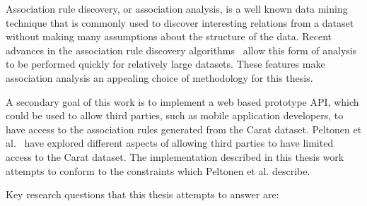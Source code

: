 Association rule discovery, or association analysis, is a well known data mining technique that is commonly used to discover interesting relations from a dataset without making many assumptions about the structure of the data. Recent advances in the association rule discovery algorithms~\cite{Han:2000:MFP:335191.335372, Li:2008:PPF:1454008.1454027} allow this form of analysis to be performed quickly for relatively large datasets. These features make association analysis an appealing choice of methodology for this thesis.  

A secondary goal of this work is to implement a web based prototype API, which could be used to allow third parties, such as mobile application developers, to have access to the association rules generated from the Carat dataset. Peltonen et al.~\cite{7840871} have explored different aspects of allowing third parties to have limited access to the Carat dataset. The implementation described in this thesis work attempts to conform to the constraints which Peltonen et al. describe.        




Key research questions that this thesis attempts to answer are:

